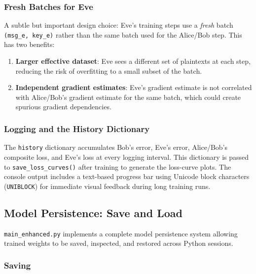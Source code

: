\documentclass[12pt, a4paper]{article}
\newcommand{\code}[1]{\texttt{\color{CodeRed}#1}}
\begin{document}
\subsubsection*{Fresh Batches for Eve}

A subtle but important design choice: Eve's training steps use a
\emph{fresh} batch \code{(msg\_e, key\_e)} rather than the same batch
used for the Alice/Bob step. This has two benefits:

\begin{enumerate}[leftmargin=2em, itemsep=3pt]
  \item \textbf{Larger effective dataset}: Eve sees a different set of
        plaintexts at each step, reducing the risk of overfitting to
        a small subset of the batch.
  \item \textbf{Independent gradient estimates}: Eve's gradient estimate
        is not correlated with Alice/Bob's gradient estimate for the
        same batch, which could create spurious gradient dependencies.
\end{enumerate}

\subsubsection*{Logging and the History Dictionary}

The \code{history} dictionary accumulates Bob's error, Eve's error,
Alice/Bob's composite loss, and Eve's loss at every logging interval.
This dictionary is passed to \code{save\_loss\_curves()} after training
to generate the loss-curve plots. The console output includes a text-based
progress bar using Unicode block characters (\code{UNIBLOCK}) for
immediate visual feedback during long training runs.

\subsection{Model Persistence: Save and Load}
\label{subsec:persistence}

\code{main\_enhanced.py} implements a complete model persistence system
allowing trained weights to be saved, inspected, and restored across
Python sessions.

\subsubsection*{Saving}
\end{document}
